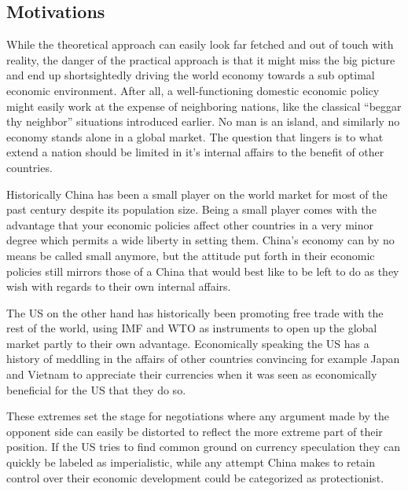 



\subsection{Motivations}

While the theoretical approach can easily look far fetched and out of 
touch with reality, the danger of the practical approach is that it 
might miss the big picture and end up shortsightedly driving the world 
economy towards a sub optimal economic environment. After all, a 
well-functioning domestic economic policy might easily work at the 
expense of neighboring nations, like the classical ``beggar thy 
neighbor'' situations introduced earlier. No man is an island, and 
similarly no economy stands alone in a global market. The question that 
lingers is to what extend a nation should be limited in it's internal 
affairs to the benefit of other countries.

Historically China has been a small player on the world market for most 
of the past century despite its population size. Being a small player 
comes with the advantage that your economic policies affect other 
countries in a very minor degree which permits a wide liberty in setting 
them. China's economy can by no means be called small anymore, but the 
attitude put forth in their economic policies still mirrors those of a 
China that would best like to be left to do as they wish with regards to 
their own internal affairs.

The US on the other hand has historically been promoting free trade with 
the rest of the world, using IMF and WTO as instruments to open up the 
global market partly to their own advantage. Economically speaking the 
US has a history of meddling in the affairs of other countries 
convincing for example Japan and Vietnam to appreciate their currencies 
when it was seen as economically beneficial for the US that they do so.

These extremes set the stage for negotiations where any argument made by 
the opponent side can easily be distorted to reflect the more extreme 
part of their position. If the US tries to find common ground on 
currency speculation they can quickly be labeled as imperialistic, while 
any attempt China makes to retain control over their economic 
development could be categorized as protectionist.




